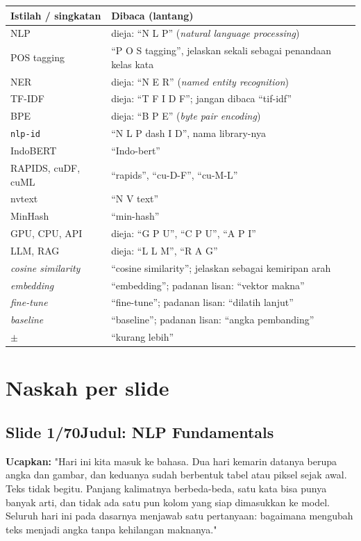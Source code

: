 \documentclass[11pt]{article}
\renewcommand{\framebox}[1]{\colorbox{acc!15}{\textcolor{acc}{\textbf{#1}}}}
\begin{document}
\renewcommand{\arraystretch}{1.3}
\begin{longtable}{@{}p{} p{}@{}}
\hline
\textbf{Istilah / singkatan} & \textbf{Dibaca (lantang)} \\ \hline
\endhead
NLP & dieja: ``N L P'' (\emph{natural language processing}) \\
POS tagging & ``P O S tagging'', jelaskan sekali sebagai penandaan kelas kata \\
NER & dieja: ``N E R'' (\emph{named entity recognition}) \\
TF-IDF & dieja: ``T F I D F''; jangan dibaca ``tif-idf'' \\
BPE & dieja: ``B P E'' (\emph{byte pair encoding}) \\
\texttt{nlp-id} & ``N L P dash I D'', nama library-nya \\
IndoBERT & ``Indo-bert'' \\
RAPIDS, cuDF, cuML & ``rapids'', ``cu-D-F'', ``cu-M-L'' \\
nvtext & ``N V text'' \\
MinHash & ``min-hash'' \\
GPU, CPU, API & dieja: ``G P U'', ``C P U'', ``A P I'' \\
LLM, RAG & dieja: ``L L M'', ``R A G'' \\
\emph{cosine similarity} & ``cosine similarity''; jelaskan sebagai kemiripan arah \\
\emph{embedding} & ``embedding''; padanan lisan: ``vektor makna'' \\
\emph{fine-tune} & ``fine-tune''; padanan lisan: ``dilatih lanjut'' \\
\emph{baseline} & ``baseline''; padanan lisan: ``angka pembanding'' \\
$\pm$ & ``kurang lebih'' \\
\hline
\end{longtable}

\vspace{2mm}
\section*{Naskah per slide}

\subsection*{\framebox{Slide 1/70}\quad Judul: NLP Fundamentals}
\textbf{Ucapkan:} "Hari ini kita masuk ke bahasa. Dua hari kemarin datanya berupa angka dan gambar, dan keduanya sudah berbentuk tabel atau piksel sejak awal. Teks tidak begitu. Panjang kalimatnya berbeda-beda, satu kata bisa punya banyak arti, dan tidak ada satu pun kolom yang siap dimasukkan ke model. Seluruh hari ini pada dasarnya menjawab satu pertanyaan: bagaimana mengubah teks menjadi angka tanpa kehilangan maknanya."\\[2pt]
\end{document}
